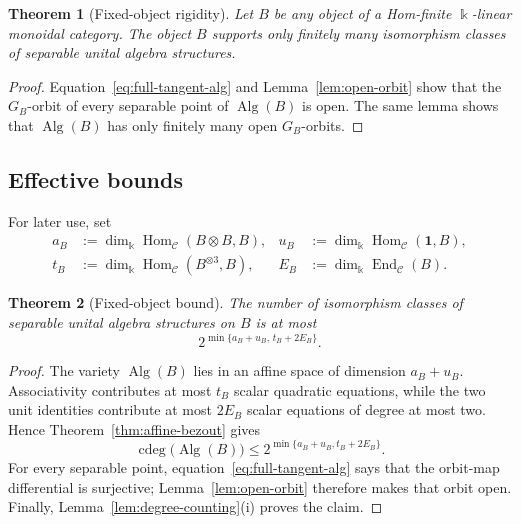 \documentclass[11pt]{amsart}
\newtheorem{theorem}{Theorem}[section]
\theoremstyle{definition}
\theoremstyle{remark}
\newcommand{\C}{\mathcal C}
\newcommand{\one}{\mathbf 1}
\newcommand{\kk}{\Bbbk}
\DeclareMathOperator{\Hom}{Hom}
\DeclareMathOperator{\End}{End}
\DeclareMathOperator{\Alg}{Alg}
\DeclareMathOperator{\cdeg}{cdeg}
\begin{document}
\begin{theorem}[Fixed-object rigidity]\label{thm:fixed-object}
Let $B$ be any object of a Hom-finite $\kk$-linear monoidal category.  The
object $B$ supports only finitely many isomorphism classes of separable
unital algebra structures.
\end{theorem}

\begin{proof}
Equation~\eqref{eq:full-tangent-alg} and
Lemma~\ref{lem:open-orbit} show that the $G_B$-orbit of every separable point
of $\Alg(B)$ is open.  The same lemma shows that $\Alg(B)$ has only finitely
many open $G_B$-orbits.
\end{proof}


\subsection{Effective bounds}

For later use, set
\begin{equation}\label{eq:fixed-object-data}
\begin{aligned}
 a_B&:=\dim_{\kk}\Hom_{\C}(B\otimes B,B),
 &u_B&:=\dim_{\kk}\Hom_{\C}(\one,B),\\
 t_B&:=\dim_{\kk}\Hom_{\C}(B^{\otimes3},B),
 &E_B&:=\dim_{\kk}\End_{\C}(B).
\end{aligned}
\end{equation}

\begin{theorem}[Fixed-object bound]\label{thm:fixed-object-bound}
The number of isomorphism classes of separable unital algebra structures on
$B$ is at most
\begin{equation}\label{eq:fixed-object-bound}
 2^{\min\{a_B+u_B,\,t_B+2E_B\}}.
\end{equation}
\end{theorem}

\begin{proof}
The variety $\Alg(B)$ lies in an affine space of dimension $a_B+u_B$.
Associativity contributes at most $t_B$ scalar quadratic equations, while
the two unit identities contribute at most $2E_B$ scalar equations of
degree at most two.  Hence Theorem~\ref{thm:affine-bezout} gives
\[
 \cdeg\bigl(\Alg(B)\bigr)
 \leq 2^{\min\{a_B+u_B,t_B+2E_B\}}.
\]
For every separable point, equation~\eqref{eq:full-tangent-alg} says that the
orbit-map differential is surjective; Lemma~\ref{lem:open-orbit} therefore
makes that orbit open.  Finally,
Lemma~\ref{lem:degree-counting}\textup{(i)} proves the claim.
\end{proof}
\end{document}
